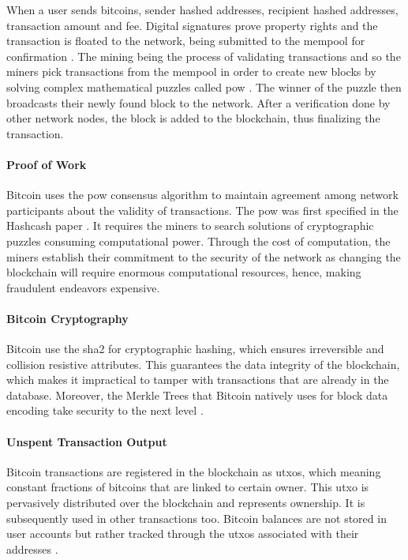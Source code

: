 When a user sends bitcoins, sender hashed addresses, recipient hashed addresses, transaction amount and fee. Digital signatures prove property rights and the transaction 
is floated to the network, being submitted to the mempool for confirmation \cite{bitcoincom}. The mining being the process of validating transactions and so the miners pick transactions 
from the \gls{mempool} in order to create new blocks by solving complex mathematical puzzles called \gls{pow} \cite{9129332}. The winner of the puzzle then 
broadcasts their newly found block to the network. After a verification done by other network nodes, the block is added to the blockchain, thus finalizing the transaction.

\paragraph{Proof of Work}

Bitcoin uses the \gls{pow} consensus algorithm to maintain agreement among network participants about the validity of transactions. The \gls{pow} was first 
specified in the Hashcash paper \cite{9129332}. It requires the miners to search solutions of cryptographic puzzles consuming computational power. Through the cost of computation, the miners
establish their commitment to the security of the network as changing the blockchain will require enormous computational resources, hence, making fraudulent endeavors expensive.

\paragraph{Bitcoin Cryptography}

Bitcoin use the \gls{sha2} for cryptographic hashing, which ensures irreversible and collision resistive attributes. This guarantees the data integrity of the 
blockchain, which makes it impractical to tamper with transactions that are already in the database. Moreover, the Merkle Trees that Bitcoin natively uses for block data 
encoding take security to the next level \cite{9129332}.

\paragraph{Unspent Transaction Output} 

Bitcoin transactions are registered in the blockchain as \gls{utxo}s, which meaning constant fractions of bitcoins that are linked to certain owner. 
This \gls{utxo} is pervasively distributed over the blockchain and represents ownership. It is subsequently used in other transactions too. Bitcoin balances are not stored in user 
accounts but rather tracked through the \gls{utxo}s associated with their addresses \cite{bitcoincom}.

